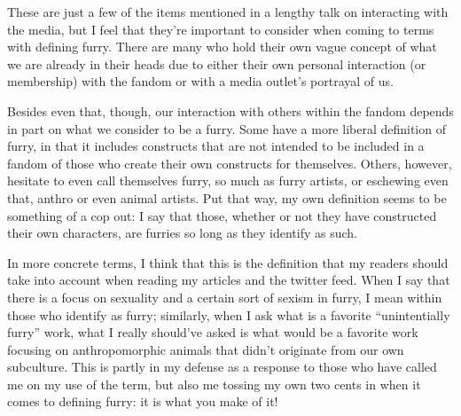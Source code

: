 These are just a few of the items mentioned in a lengthy talk on interacting with the media, but I feel that they're important to consider when coming to terms with defining furry.  There are many who hold their own vague concept of what we are already in their heads due to either their own personal interaction (or membership) with the fandom or with a media outlet's portrayal of us.

Besides even that, though, our interaction with others within the fandom depends in part on what we consider to be a furry.  Some have a more liberal definition of furry, in that it includes constructs that are not intended to be included in a fandom of those who create their own constructs for themselves.  Others, however, hesitate to even call themselves furry, so much as furry artists, or eschewing even that, anthro or even animal artists.  Put that way, my own definition seems to be something of a cop out: I say that those, whether or not they have constructed their own characters, are furries so long as they identify as such.

In more concrete terms, I think that this is the definition that my readers should take into account when reading my articles and the twitter feed.  When I say that there is a focus on sexuality and a certain sort of sexism in furry, I mean within those who identify as furry; similarly, when I ask what is a favorite ``unintentially furry'' work, what I really should've asked is what would be a favorite work focusing on anthropomorphic animals that didn't originate from our own subculture. This is partly in my defense as a response to those who have called me on my use of the term, but also me tossing my own two cents in when it comes to defining furry: it is what you make of it!
